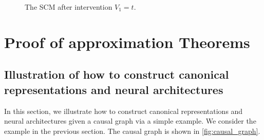 \begin{figure}[!htb]
\caption{The SCM after intervention $V_1 = t$.}
\label{fig:scm_example_int}
\end{figure}

\section{Proof of approximation Theorems}

\subsection{Illustration of how to construct canonical representations and neural architectures}\label{sec:nn_example}
In this section, we illustrate how to construct canonical representations and neural architectures given a causal graph via a simple example. We consider the example in the previous section. The causal graph is shown in \cref{fig:causal_graph}. 

